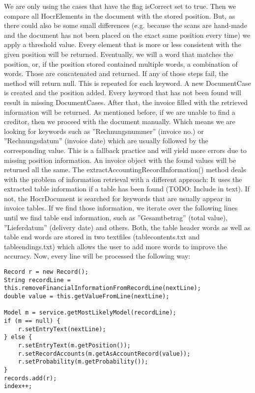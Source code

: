 We are only using the cases that have the flag isCorrect set to true. Then we compare all HocrElements in the document with the stored position. But, as there could also be some small differences (e.g. because the scans are hand-made and the document has not been placed on the exact same position every time) we apply a threshold value. Every element that is more or less consistent with the given position will be returned. Eventually, we will a word that matches the position, or, if the position stored contained multiple words, a combination of words. Those are concatenated and returned. If any of those steps fail, the method will return null.
This is repeated for each keyword. A new DocumentCase is created and the position added. Every keyword that has not been found will result in missing DocumentCases. After that, the invoice filled with the retrieved information will be returned.
As mentioned before, if we are unable to find a creditor, then we proceed with the document manually. Which means we are looking for keywords such as ''Rechnungsnummer'' (invoice no.) or ''Rechnungsdatum'' (invoice date) which are usually followed by the corresponding value. This is a fallback practice and will yield more errors due to missing position information. An invoice object with the found values will be returned all the same.
The extractAccountingRecordInformation() method deals with the problem of information retrieval with a different approach: It uses the extracted table information if a table has been found (TODO: Include in text). If not, the HocrDocument is searched for keywords that are usually appear in invoice tables. If we find those information, we iterate over the following lines until we find table end information, such as ''Gesamtbetrag'' (total value), ''Lieferdatum'' (delivery date) and others. Both, the table header words as well as table end words are stored in two textfiles (tablecontents.txt and tableendings.txt) which allows the user to add more words to improve the accuracy.
Now, every line will be processed the following way:

\begin{lstlisting}
Record r = new Record();
String recordLine = this.removeFinancialInformationFromRecordLine(nextLine);
double value = this.getValueFromLine(nextLine);

Model m = service.getMostLikelyModel(recordLine); 
if (m == null) {
    r.setEntryText(nextLine);
} else {
    r.setEntryText(m.getPosition());
    r.setRecordAccounts(m.getAsAccountRecord(value));
    r.setProbability(m.getProbability());
}
records.add(r);
index++;
\end{lstlisting}

